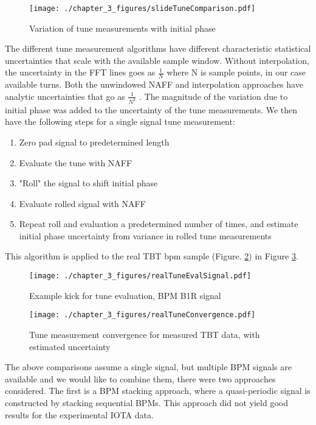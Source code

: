 \begin{figure}
	\centering
	\texttt{[image: ./chapter\_3\_figures/slideTuneComparison.pdf]}
	\caption{Variation of tune measurements with initial phase}
	\label{fig:baseRoll}
\end{figure}

The different tune measurement algorithms have different characteristic statistical uncertainties that scale with the available sample window. Without interpolation, the uncertainty in the FFT lines goes as $\frac{1}{N}$ where N is sample points, in our case available turns. Both the unwindowed NAFF and interpolation approaches have analytic uncertainties that go as $\frac{1}{N^2}$ \cite{zisopoulosRefinedBetatronTune2019,bartoliniTuneEvaluationSimulations1996}. The magnitude of the variation due to initial phase was added to the uncertainty of the tune measurements. We then have the following steps for a single signal tune measurement: \begin{enumerate}
	\item{Zero pad signal to predetermined length}
	\item{Evaluate the tune with NAFF}
	\item{"Roll" the signal to shift initial phase}
	\item{Evaluate rolled signal with NAFF}
	\item{Repeat roll and evaluation a predetermined number of times, and estimate initial phase uncertainty from variance in rolled tune measurements}
\end{enumerate}

This algorithm is applied to the real TBT bpm sample (Figure. \ref{fig:realEvalSig}) in  Figure \ref{fig:measConvRoll}.

\begin{figure}
	\centering \texttt{[image: ./chapter\_3\_figures/realTuneEvalSignal.pdf]}
	\caption{Example kick for tune evaluation, BPM B1R signal}
	\label{fig:realEvalSig}
\end{figure}


\begin{figure}
	\centering \texttt{[image: ./chapter\_3\_figures/realTuneConvergence.pdf]}
	\caption{Tune measurement convergence for measured TBT data, with estimated uncertainty}
	\label{fig:measConvRoll}
\end{figure}


The above comparisons assume a single signal, but multiple BPM signals are available and we would like to combine them, there were two approaches considered. The first is a BPM stacking approach, where a quasi-periodic signal is constructed \cite{zisopoulosRefinedBetatronTune2019} by stacking sequential BPMs. This approach did not yield good results for the experimental IOTA data.

